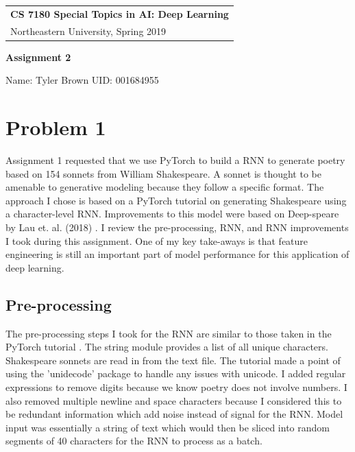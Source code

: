 \documentclass[a4paper,12pt]{article} %
\begin{document}
\thispagestyle{empty} %

\begin{tabular}{p{15.5cm}} %
{\large \bf CS 7180 Special Topics in AI: Deep Learning} \\
Northeastern University, Spring 2019 \\
\hline %
\end{tabular} %

\vspace*{0.3cm} %

\begin{center} %
    {\Large \bf Assignment 2} %
    \vspace{2mm}
    
    {Name: Tyler Brown UID: 001684955}
\end{center} 
%
\vspace{0.2cm}

\section{Problem 1}

Assignment 1 requested that we use PyTorch to build a RNN to generate
poetry based on 154 sonnets from William Shakespeare. A sonnet is thought
to be amenable to generative modeling because they follow a specific format.
The approach I chose is based on a PyTorch tutorial \cite{practica59:online}
on generating Shakespeare using a character-level RNN. Improvements to this
model were based on Deep-speare by Lau et. al. (2018) \cite{lau2018deepspeare}.
I review the pre-processing, RNN, and RNN improvements I took during this
assignment. One of my key take-aways is that feature engineering is still an
important part of model performance for this application of deep learning.

\subsection{Pre-processing}

The pre-processing steps I took for the RNN are similar to those taken
in the PyTorch tutorial \cite{practica59:online}. The string module provides
a list of all unique characters. Shakespeare sonnets are read in from the
text file. The tutorial made a point of using the 'unidecode' package to
handle any issues with unicode. I added regular expressions to remove digits
because we know poetry does not involve numbers. I also removed multiple
newline and space characters because I considered this to be redundant
information which add noise instead of signal for the RNN. Model input
was essentially a string of text which would then be sliced into random
segments of 40 characters for the RNN to process as a batch.\newline
\end{document}
